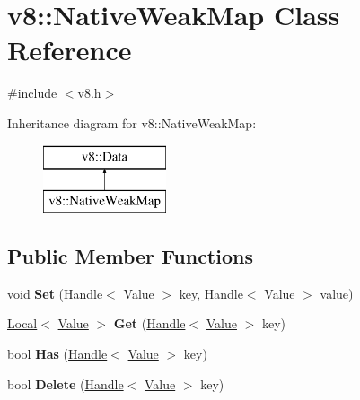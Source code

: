\hypertarget{classv8_1_1_native_weak_map}{}\section{v8\+:\+:Native\+Weak\+Map Class Reference}
\label{classv8_1_1_native_weak_map}


{\ttfamily \#include $<$v8.\+h$>$}

Inheritance diagram for v8\+:\+:Native\+Weak\+Map\+:\begin{figure}[H]
\begin{center}
\leavevmode
\includegraphics[height=2.000000cm]{classv8_1_1_native_weak_map}
\end{center}
\end{figure}
\subsection*{Public Member Functions}
\begin{DoxyCompactItemize}
\item 
\hypertarget{classv8_1_1_native_weak_map_a106360c021729da2940d57a436323e52}{}void {\bfseries Set} (\hyperlink{classv8_1_1_local}{Handle}$<$ \hyperlink{classv8_1_1_value}{Value} $>$ key, \hyperlink{classv8_1_1_local}{Handle}$<$ \hyperlink{classv8_1_1_value}{Value} $>$ value)\label{classv8_1_1_native_weak_map_a106360c021729da2940d57a436323e52}

\item 
\hypertarget{classv8_1_1_native_weak_map_a65715f9678e9286c3ff63b4a2084810d}{}\hyperlink{classv8_1_1_local}{Local}$<$ \hyperlink{classv8_1_1_value}{Value} $>$ {\bfseries Get} (\hyperlink{classv8_1_1_local}{Handle}$<$ \hyperlink{classv8_1_1_value}{Value} $>$ key)\label{classv8_1_1_native_weak_map_a65715f9678e9286c3ff63b4a2084810d}

\item 
\hypertarget{classv8_1_1_native_weak_map_ad5c0ca899639c2ec3fcf2b637376bee8}{}bool {\bfseries Has} (\hyperlink{classv8_1_1_local}{Handle}$<$ \hyperlink{classv8_1_1_value}{Value} $>$ key)\label{classv8_1_1_native_weak_map_ad5c0ca899639c2ec3fcf2b637376bee8}

\item 
\hypertarget{classv8_1_1_native_weak_map_ab590e91a69e949dfca6cdc64294282c3}{}bool {\bfseries Delete} (\hyperlink{classv8_1_1_local}{Handle}$<$ \hyperlink{classv8_1_1_value}{Value} $>$ key)\label{classv8_1_1_native_weak_map_ab590e91a69e949dfca6cdc64294282c3}

\end{DoxyCompactItemize}
